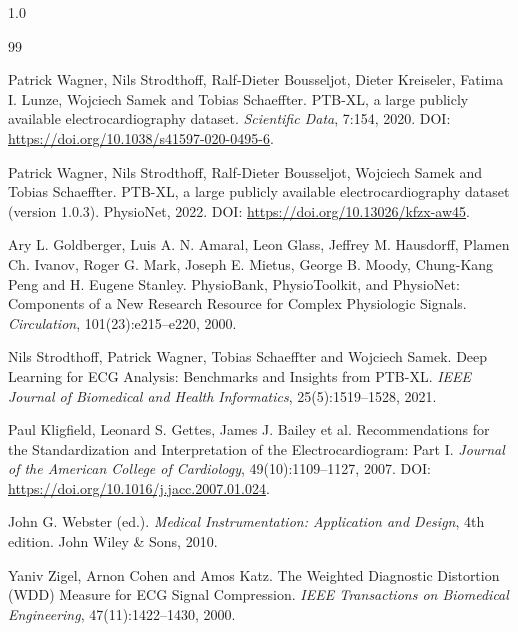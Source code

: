 \documentclass[12pt,a4paper]{article}
\begin{document}
\clearpage
\begin{spacing}{1.0}
\small
\begin{thebibliography}{99}

Patrick Wagner, Nils Strodthoff, Ralf-Dieter Bousseljot, Dieter Kreiseler, Fatima I. Lunze, Wojciech Samek and Tobias Schaeffter.
\newblock PTB-XL, a large publicly available electrocardiography dataset.
\newblock \textit{Scientific Data}, 7:154, 2020.
\newblock DOI: \url{https://doi.org/10.1038/s41597-020-0495-6}.

Patrick Wagner, Nils Strodthoff, Ralf-Dieter Bousseljot, Wojciech Samek and Tobias Schaeffter.
\newblock PTB-XL, a large publicly available electrocardiography dataset (version 1.0.3).
\newblock PhysioNet, 2022.
\newblock DOI: \url{https://doi.org/10.13026/kfzx-aw45}.

Ary L. Goldberger, Luis A. N. Amaral, Leon Glass, Jeffrey M. Hausdorff, Plamen Ch. Ivanov, Roger G. Mark, Joseph E. Mietus, George B. Moody, Chung-Kang Peng and H. Eugene Stanley.
\newblock PhysioBank, PhysioToolkit, and PhysioNet: Components of a New Research Resource for Complex Physiologic Signals.
\newblock \textit{Circulation}, 101(23):e215--e220, 2000.

Nils Strodthoff, Patrick Wagner, Tobias Schaeffter and Wojciech Samek.
\newblock Deep Learning for ECG Analysis: Benchmarks and Insights from PTB-XL.
\newblock \textit{IEEE Journal of Biomedical and Health Informatics}, 25(5):1519--1528, 2021.

Paul Kligfield, Leonard S. Gettes, James J. Bailey et al.
\newblock Recommendations for the Standardization and Interpretation of the Electrocardiogram: Part I.
\newblock \textit{Journal of the American College of Cardiology}, 49(10):1109--1127, 2007.
\newblock DOI: \url{https://doi.org/10.1016/j.jacc.2007.01.024}.

John G. Webster (ed.).
\newblock \textit{Medical Instrumentation: Application and Design}, 4th edition.
\newblock John Wiley \& Sons, 2010.

Yaniv Zigel, Arnon Cohen and Amos Katz.
\newblock The Weighted Diagnostic Distortion (WDD) Measure for ECG Signal Compression.
\newblock \textit{IEEE Transactions on Biomedical Engineering}, 47(11):1422--1430, 2000.


\end{thebibliography}
\end{spacing}
\end{document}
